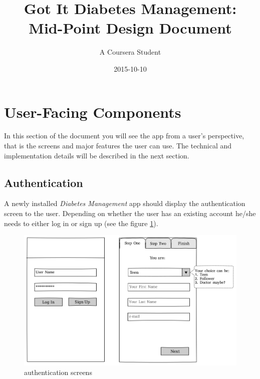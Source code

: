 \documentclass{article}
\title{Got It Diabetes Management:\\Mid-Point Design Document}
\date{2015-10-10}
\author{A Coursera Student}
\begin{document}
    \maketitle
    \newpage

    \section{User-Facing Components}

    In this section of the document you will see the app from a user's perspective, that is the screens and major features the user can use. The technical and implementation details will be described in the next section.

    \newpage

    \subsection{Authentication}

    A newly installed \emph{Diabetes Management} app should display the authentication screen to the user. Depending on whether the user has an existing account he/she needs to either log in or sign up (see the figure \ref{fig:screen_auth}).

    \begin{figure}[h]
        \centering
        \includegraphics[width=\textwidth,height=\textheight,keepaspectratio]{auth.png}
        \caption{authentication screens}
        \label{fig:screen_auth}
    \end{figure}
\end{document}
